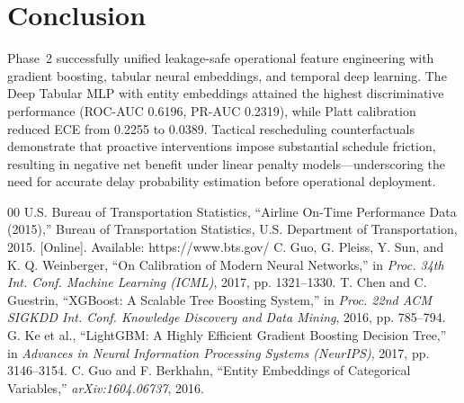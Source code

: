 \documentclass[conference]{IEEEtran}
\begin{document}
\section{Conclusion}
Phase~2 successfully unified leakage-safe operational feature engineering with gradient boosting, tabular neural embeddings, and temporal deep learning. The Deep Tabular MLP with entity embeddings attained the highest discriminative performance (ROC-AUC \mbox{0.6196}, PR-AUC \mbox{0.2319}), while Platt calibration reduced ECE from \mbox{0.2255} to \mbox{0.0389}. Tactical rescheduling counterfactuals demonstrate that proactive interventions impose substantial schedule friction, resulting in negative net benefit under linear penalty models---underscoring the need for accurate delay probability estimation before operational deployment.

\begin{thebibliography}{00}
 U.S. Bureau of Transportation Statistics, ``Airline On-Time Performance Data (2015),'' Bureau of Transportation Statistics, U.S. Department of Transportation, 2015. [Online]. Available: https://www.bts.gov/
 C. Guo, G. Pleiss, Y. Sun, and K. Q. Weinberger, ``On Calibration of Modern Neural Networks,'' in \textit{Proc. 34th Int. Conf. Machine Learning (ICML)}, 2017, pp. 1321--1330.
 T. Chen and C. Guestrin, ``XGBoost: A Scalable Tree Boosting System,'' in \textit{Proc. 22nd ACM SIGKDD Int. Conf. Knowledge Discovery and Data Mining}, 2016, pp. 785--794.
 G. Ke et al., ``LightGBM: A Highly Efficient Gradient Boosting Decision Tree,'' in \textit{Advances in Neural Information Processing Systems (NeurIPS)}, 2017, pp. 3146--3154.
 C. Guo and F. Berkhahn, ``Entity Embeddings of Categorical Variables,'' \textit{arXiv:1604.06737}, 2016.
\end{thebibliography}
\end{document}
